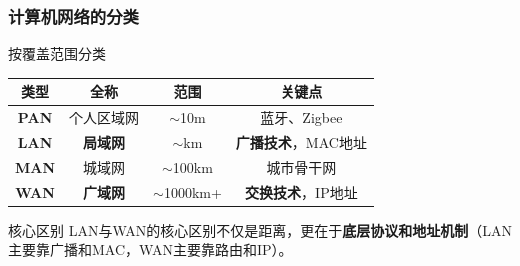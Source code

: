 \documentclass[10pt, aspectratio=169]{beamer}
\begin{document}
\subsubsection{计算机网络的分类}
\begin{frame}{按覆盖范围分类}
    \begin{table}
        \begin{tabular}{|c|c|c|c|}
            \hline
            \textbf{类型} & \textbf{全称} & \textbf{范围} & \textbf{关键点} \\ \hline
            \textbf{PAN} & 个人区域网 & $\sim$10m & 蓝牙、Zigbee \\
            \textbf{LAN} & \textbf{局域网} & $\sim$km & \textbf{广播技术}，MAC地址 \\
            \textbf{MAN} & 城域网 & $\sim$100km & 城市骨干网 \\
            \textbf{WAN} & \textbf{广域网} & $\sim$1000km+ & \textbf{交换技术}，IP地址 \\
            \hline
        \end{tabular}
    \end{table}
    \vspace{0.5em}
    \begin{alertblock}{核心区别}
        LAN与WAN的核心区别不仅是距离，更在于\textbf{底层协议和地址机制}（LAN主要靠广播和MAC，WAN主要靠路由和IP）。
    \end{alertblock}
\end{frame}
\end{document}
